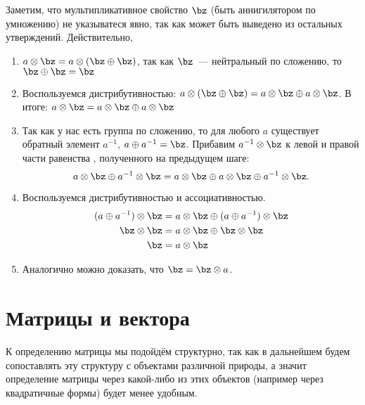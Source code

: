 Заметим, что мультипликативное свойство $\bz$ (быть аннигилятором по умножению) не указыватеся явно, так как может быть выведено из остальных утверждений.
Действительно,
\begin{enumerate}
    \item $a \otimes \bz = a \otimes (\bz \oplus \bz)$, так как $\bz$~--- нейтральный по сложению, то $\bz \oplus \bz = \bz$
    \item Воспользуемся дистрибутивностью: $a \otimes (\bz \oplus \bz) = a \otimes \bz \oplus a \otimes \bz$.
          В итоге: $a \otimes \bz = a \otimes \bz \oplus a \otimes \bz$
    \item Так как у нас есть группа по сложению, то для любого $a$ существует обратный элемент $a^{-1}$, $a \oplus a^{-1} = \bz$.
          Прибавим $a^{-1} \otimes \bz$ к левой и правой части равенства%
          , полученного на предыдущем шаге:
          \[a \otimes \bz \oplus a^{-1} \otimes \bz = a \otimes \bz \oplus a \otimes \bz \oplus a^{-1} \otimes \bz.\]
    \item Воспользуемся дистрибутивностью и ассоциативностью.
          \begin{align*}
              (a \oplus a^{-1}) \otimes \bz & = a \otimes \bz \oplus (a  \oplus a^{-1}) \otimes \bz \\
              \bz \otimes \bz               & = a \otimes \bz \oplus \bz \otimes \bz                \\
              \bz                           & = a \otimes \bz
          \end{align*}
    \item Аналогично можно доказать, что $\bz = \bz \otimes a$.
\end{enumerate}


\section{Матрицы и вектора}

К определению матрицы мы подойдём структурно, так как в дальнейшем будем сопоставлять эту структуру с объектами различной природы, а значит определение матрицы через какой-либо из этих объектов (например через квадратичные формы) будет менее удобным.

